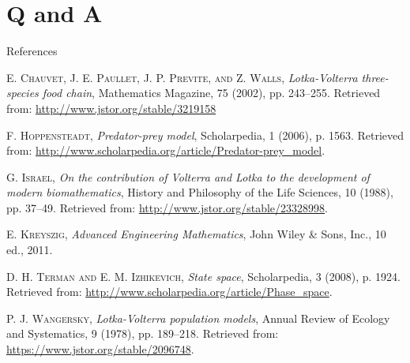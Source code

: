 \documentclass[hyperref={colorlinks,allcolors=black}]{beamer}
\begin{document}
\section*{Q and A}


\begin{frame}{References}
    \begin{thebibliography}{6}\scriptsize

            \textsc{E. Chauvet, J. E. Paullet, J. P. Previte, and Z. Walls},
            \textit{Lotka-Volterra three-species food chain}, Mathematics
            Magazine, 75 (2002), pp. 243–255. Retrieved from:
            \url{http://www.jstor.org/stable/3219158}

            \textsc{F. Hoppensteadt}, \textit{Predator-prey model},
            Scholarpedia, 1 (2006), p. 1563. Retrieved from:
            \url{http://www.scholarpedia.org/article/Predator-prey_model}.

            \textsc{G. Israel}, \textit{On the contribution of Volterra and
            Lotka to the development of modern biomathematics}, History and
            Philosophy of the Life Sciences, 10 (1988), pp. 37–49. Retrieved
            from: \url{http://www.jstor.org/stable/23328998}.

            \textsc{E. Kreyszig}, \textit{Advanced Engineering Mathematics},
            John Wiley \& Sons, Inc., 10 ed., 2011.

            \textsc{D. H. Terman and E. M. Izhikevich}, \textit{State space},
            Scholarpedia, 3 (2008), p. 1924. Retrieved from:
            \url{http://www.scholarpedia.org/article/Phase_space}.

            \textsc{P. J. Wangersky}, \textit{Lotka-Volterra population
            models}, Annual Review of Ecology and Systematics, 9 (1978), pp.
            189–218. Retrieved from:
            \url{https://www.jstor.org/stable/2096748}.

    \end{thebibliography}
\end{frame}
\end{document}

